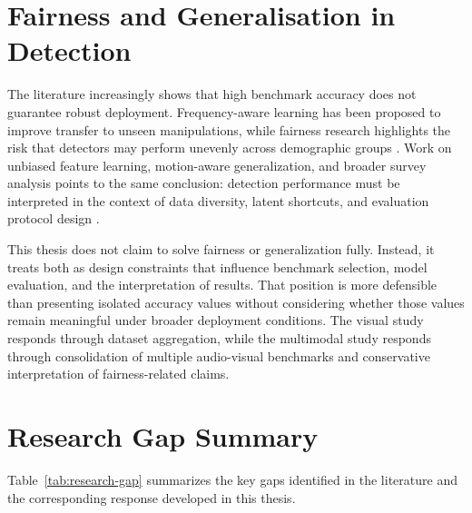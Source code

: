 \section{Fairness and Generalisation in Detection}

The literature increasingly shows that high benchmark accuracy does not guarantee robust deployment. Frequency-aware learning has been proposed to improve transfer to unseen manipulations, while fairness research highlights the risk that detectors may perform unevenly across demographic groups \cite{Kim2024Freq,Ju2024Fairness}. Work on unbiased feature learning, motion-aware generalization, and broader survey analysis points to the same conclusion: detection performance must be interpreted in the context of data diversity, latent shortcuts, and evaluation protocol design \cite{fu2025unbiased,prashnani2024phase,mubarak2023survey}.

This thesis does not claim to solve fairness or generalization fully. Instead, it treats both as design constraints that influence benchmark selection, model evaluation, and the interpretation of results. That position is more defensible than presenting isolated accuracy values without considering whether those values remain meaningful under broader deployment conditions. The visual study responds through dataset aggregation, while the multimodal study responds through consolidation of multiple audio-visual benchmarks and conservative interpretation of fairness-related claims.

\section{Research Gap Summary}

Table~\ref{tab:research-gap} summarizes the key gaps identified in the literature and the corresponding response developed in this thesis.

